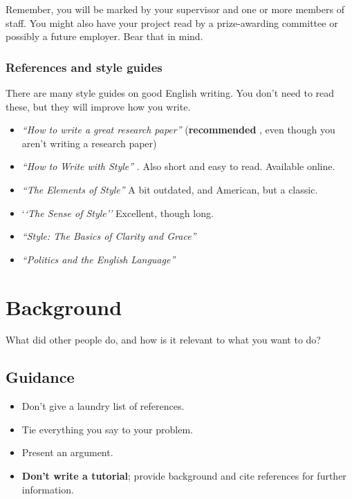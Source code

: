 \documentclass{l4proj}
\begin{document}
Remember, you will be marked by your supervisor and one or more members
of staff. You might also have your project read by a prize-awarding
committee or possibly a future employer. Bear that in mind.

\subsection{References and style guides}
There are many style guides on good English writing. You don't need to
read these, but they will improve how you write.

\begin{itemize}
\item
  \emph{``How to write a great research paper''} \cite{Pey17} (\textbf{recommended
  }, even though you aren't writing a research paper)
\item
\emph{``How to Write with Style''} \cite{Von80}. Also short and easy to read. Available online.
\item
\emph{``The Elements of Style''} \cite{StrWhi07} A bit outdated, and
  American, but a classic.
\item
  `\emph{`The Sense of Style''} \cite{Pin15} Excellent, though long.
\item
\emph{``Style: The Basics of Clarity and Grace''} \cite{Wil09}
\item
\emph{``Politics and the English Language''} \cite{Orw68}  

\end{itemize}
\chapter{Background}
What did other people do, and how is it relevant to what you want to do?
\section{Guidance}
\begin{itemize}    
    \item
      Don't give a laundry list of references.
    \item
      Tie everything you say to your problem.
    \item
      Present an argument.
    \item
      \textbf{Don't write a tutorial}; provide background and cite
      references for further information.
\end{itemize}
\end{document}
